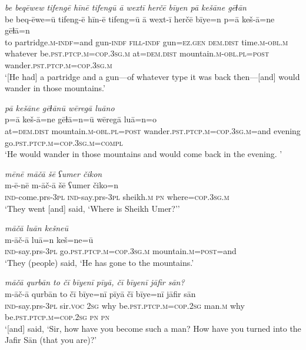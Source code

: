 \ea \label{ŠJ.7}
\textit{be beqēwew tifengē hīnē tifengū ā wextī herčē bīyen pā kešāne gēɫān} \\ 
\gll be beq-ēwe=ū tifeng-ē hīn-ē tifeng=ū ā wext-ī herčē bīye=n p=ā keš-ā=ne gēɫā=n \\ 
 to partridge\textsc{.m}\textsc{-indf}=and gun\textsc{-indf} \textsc{fill}\textsc{-indf} gun\textsc{=ez.gen} \textsc{dem.dist} time\textsc{.m}\textsc{-obl}\textsc{.m} whatever be\textsc{.pst}\textsc{.ptcp}\textsc{.m}\textsc{=cop}\textsc{.3sg}\textsc{.m} at=\textsc{dem.dist} mountain\textsc{.m}\textsc{-obl}\textsc{.pl}\textsc{=\textsc{post}} wander\textsc{.pst}\textsc{.ptcp}\textsc{.m}\textsc{=cop}\textsc{.3sg}\textsc{.m} \\ 
\glt `[He had] a partridge and a gun—of whatever type it was back then—[and] would wander in those mountains.'
\z 
 
\ea \label{ŠJ.8}
\textit{pā kešāne gēɫānū wēregā luāno} \\ 
\gll p=ā keš-ā=ne gēɫā=n=ū wēregā luā=n=o \\ 
 at=\textsc{dem.dist} mountain\textsc{.m}\textsc{-obl}\textsc{.pl}\textsc{=\textsc{post}} wander\textsc{.pst}\textsc{.ptcp}\textsc{.m}\textsc{=cop}\textsc{.3sg}\textsc{.m}=and evening go\textsc{.pst}\textsc{.ptcp}\textsc{.m}\textsc{=cop}\textsc{.3sg}\textsc{.m}\textsc{=compl} \\ 
\glt `He would wander in those mountains and would come back in the evening. '
\z 
 
\ea \label{ŠJ.10}
\textit{mēnē māčā šē ʕumer čikon} \\ 
\gll m-ē-nē m-āč-ā šē ʕumer čiko=n \\ 
 \textsc{ind-}come.prs\textsc{-3pl} \textsc{ind-}say.prs\textsc{-3pl} sheikh\textsc{.m} \textsc{pn} where\textsc{=cop}\textsc{.3sg}\textsc{.m} \\ 
\glt `They went [and] said, ‘Where is Sheikh Umer?’'
\z 
 
\ea \label{ŠJ.11}
\textit{māčā luān kešneū} \\ 
\gll m-āč-ā luā=n keš=ne=ū \\ 
 \textsc{ind-}say.prs\textsc{-3pl} go\textsc{.pst}\textsc{.ptcp}\textsc{.m}\textsc{=cop}\textsc{.3sg}\textsc{.m} mountain\textsc{.m}\textsc{=\textsc{post}}=and \\ 
\glt `They (people) said, ‘He has gone to the mountains.'
\z 
 
\ea \label{ŠJ.14}
\textit{māčā qurbān to čī bīyenī pīyā, čī bīyenī jāfir sān?} \\ 
\gll m-āč-ā qurbān to čī bīye=nī pīyā čī bīye=nī jāfir sān \\ 
 \textsc{ind-}say.prs\textsc{-3pl} sir.\textsc{voc} \textsc{2sg} why be\textsc{.pst}\textsc{.ptcp}\textsc{.m}\textsc{=cop}\textsc{.\textsc{2sg}} man\textsc{.m} why be\textsc{.pst}\textsc{.ptcp}\textsc{.m}\textsc{=cop}\textsc{.\textsc{2sg}} \textsc{pn} \textsc{pn} \\ 
\glt `[and] said, ‘Sir, how have you become such a man? How have you turned into the Jafir Sān (that you are)?'
\z 
 
